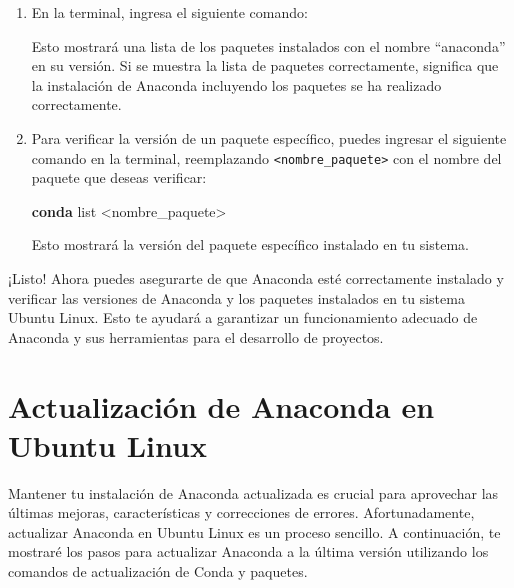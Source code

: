 \documentclass[
  letterpaper,
  DIV=11,
  numbers=noendperiod]{scrartcl}
\newenvironment{Shaded}{}{}
\newcommand{\ExtensionTok}[1]{\textcolor[rgb]{0.84,0.23,0.29}{\textbf{#1}}}
\newcommand{\NormalTok}[1]{\textcolor[rgb]{0.14,0.16,0.18}{#1}}
\newcommand{\OperatorTok}[1]{\textcolor[rgb]{0.14,0.16,0.18}{#1}}
\begin{document}
\begin{enumerate}
\def\labelenumi{\arabic{enumi}.}
\item
  En la terminal, ingresa el siguiente comando:

\begin{Shaded}
\end{Shaded}

  Esto mostrará una lista de los paquetes instalados con el nombre
  ``anaconda'' en su versión. Si se muestra la lista de paquetes
  correctamente, significa que la instalación de Anaconda incluyendo los
  paquetes se ha realizado correctamente.
\item
  Para verificar la versión de un paquete específico, puedes ingresar el
  siguiente comando en la terminal, reemplazando
  \texttt{\textless{}nombre\_paquete\textgreater{}} con el nombre del
  paquete que deseas verificar:

\begin{Shaded}
\begin{Highlighting}[]
\ExtensionTok{conda}\NormalTok{ list }\OperatorTok{\textless{}}\NormalTok{nombre\_paquete}\OperatorTok{\textgreater{}}
\end{Highlighting}
\end{Shaded}

  Esto mostrará la versión del paquete específico instalado en tu
  sistema.
\end{enumerate}

¡Listo! Ahora puedes asegurarte de que Anaconda esté correctamente
instalado y verificar las versiones de Anaconda y los paquetes
instalados en tu sistema Ubuntu Linux. Esto te ayudará a garantizar un
funcionamiento adecuado de Anaconda y sus herramientas para el
desarrollo de proyectos.

\hypertarget{actualizaciuxf3n-de-anaconda-en-ubuntu-linux}{%
\section{Actualización de Anaconda en Ubuntu
Linux}\label{actualizaciuxf3n-de-anaconda-en-ubuntu-linux}}

Mantener tu instalación de Anaconda actualizada es crucial para
aprovechar las últimas mejoras, características y correcciones de
errores. Afortunadamente, actualizar Anaconda en Ubuntu Linux es un
proceso sencillo. A continuación, te mostraré los pasos para actualizar
Anaconda a la última versión utilizando los comandos de actualización de
Conda y paquetes.
\end{document}
